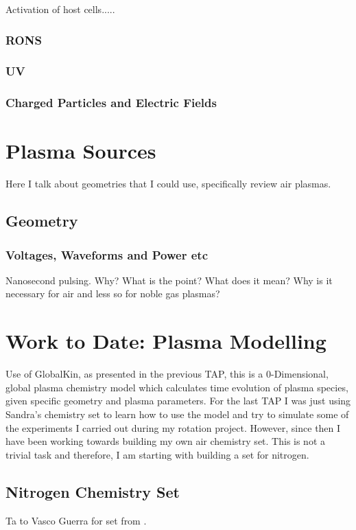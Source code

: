 \documentclass[11pt, oneside]{article}   	%
\begin{document}
Activation of host cells..... 

\subsubsection{RONS}
\subsubsection{UV}
\subsubsection{Charged Particles and Electric Fields}



\section{Plasma Sources}
Here I talk about geometries that I could use, specifically review air plasmas.
\subsection{Geometry}
\subsubsection{Voltages, Waveforms and Power etc}

Nanosecond pulsing.
Why? What is the point? What does it mean? Why is it necessary for air and less so for noble gas plasmas?


\section{Work to Date: Plasma Modelling}
Use of GlobalKin, as presented in the previous TAP, this is a 0-Dimensional, global plasma chemistry model which calculates time evolution of plasma species, given specific geometry and plasma parameters.
For the last TAP I was just using Sandra's chemistry set to learn how to use the model and try to simulate some of the experiments I carried out during my rotation project.
However, since then I have been working towards building my own air chemistry set.
This is not a trivial task and therefore, I am starting with building a set for nitrogen.

\subsection{Nitrogen Chemistry Set}
Ta to Vasco Guerra for set from \cite{Kutasi2016tuning}.
\end{document}
